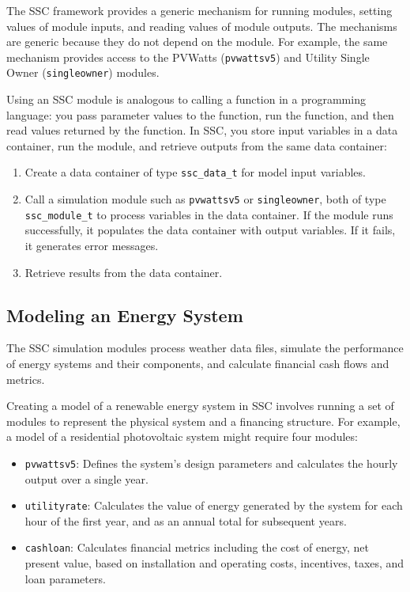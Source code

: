 \documentclass{scrartcl} %
\begin{document}
The SSC framework provides a generic mechanism for running modules, setting values of module inputs, and reading values of module outputs. The mechanisms are generic because they do not depend on the module. For example, the same mechanism provides access to the PVWatts (\texttt{pvwattsv5}) and Utility Single Owner (\texttt{singleowner}) modules.  

Using an SSC module is analogous to calling a function in a programming language: you pass parameter values to the function, run the function, and then read values returned by the function.  In SSC, you store input variables in a data container, run the module, and retrieve outputs from the same data container:

\begin{enumerate}
\item Create a data container of type \texttt{ssc\_data\_t} for model input variables.
\item Call a simulation module such as \texttt{pvwattsv5} or \texttt{singleowner}, both of type \texttt{ssc\_module\_t} to process variables in the data container. If the module runs successfully, it populates the data container with output variables. If it fails, it generates error messages.
\item Retrieve results from the data container.
\end{enumerate}

\subsection{Modeling an Energy System}
\label{sec_modeling_systems}

The SSC simulation modules process weather data files, simulate the performance of energy systems and their components, and calculate financial cash flows and metrics.

Creating a model of a renewable energy system in SSC involves running a set of modules to represent the physical system and a financing structure. For example, a model of a residential photovoltaic system might require four modules:

\begin{itemize}
\item \texttt{pvwattsv5}: Defines the system's design parameters and calculates the hourly output over a single year.
\item \texttt{utilityrate}: Calculates the value of energy generated by the system for each hour of the first year, and as an annual total for subsequent years.
\item \texttt{cashloan}: Calculates financial metrics including the cost of energy, net present value, based on installation and operating costs, incentives, taxes, and loan parameters.
\end{itemize}
\end{document}
